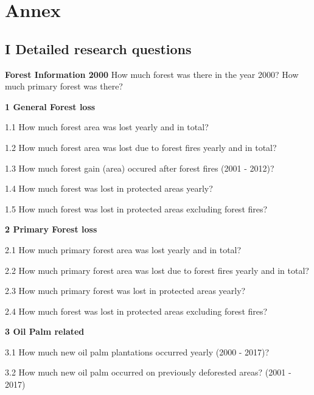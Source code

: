 \documentclass[
  letterpaper,
  DIV=11,
  numbers=noendperiod]{scrreprt}
\begin{document}
\listoffigures

\listoftables


\hypertarget{annex}{%
\chapter*{Annex}\label{annex}}



\hypertarget{detailed-research-questions}{%
\section*{\texorpdfstring{\textsc{I} Detailed research
questions}{ Detailed research questions}}\label{detailed-research-questions}}


\textbf{Forest Information 2000} How much forest was there in the year
2000? How much primary forest was there?

\textbf{1 General Forest loss}

1.1 How much forest area was lost yearly and in total?

1.2 How much forest area was lost due to forest fires yearly and in
total?

1.3 How much forest gain (area) occured after forest fires (2001 -
2012)?

1.4 How much forest was lost in protected areas yearly?

1.5 How much forest was lost in protected areas excluding forest fires?

\textbf{2 Primary Forest loss}

2.1 How much primary forest area was lost yearly and in total?

2.2 How much primary forest area was lost due to forest fires yearly and
in total?

2.3 How much primary forest was lost in protected areas yearly?

2.4 How much forest was lost in protected areas excluding forest fires?

\textbf{3 Oil Palm related}

3.1 How much new oil palm plantations occurred yearly (2000 - 2017)?

3.2 How much new oil palm occurred on previously deforested areas? (2001
- 2017)
\end{document}
